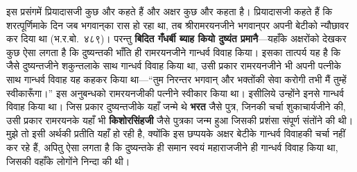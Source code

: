 \begin{sloppypar}\justifying{}
इस प्रसंगमें प्रियादासजी कुछ और कहते हैं और अक्षर कुछ और कहता है। प्रियादासजी कहते हैं कि शरत्पूर्णिमाके दिन जब भगवान्‌का रास हो रहा था, तब श्रीरामरयनजीने भगवान्‌पर अपनी बेटीको न्यौछावर कर दिया था (भ.र.बो.~४८९)। परन्तु \textbf{बिदित गँधर्बी ब्याह कियो दुष्यंत प्रमानै}—यहाँके अक्षरोंको देखकर कुछ ऐसा लगता है कि दुष्यन्तकी भाँति ही रामरयनजीने गान्धर्व विवाह किया। इसका तात्पर्य यह है कि जैसे दुष्यन्तजीने शकुन्तलाके साथ गान्धर्व विवाह किया था, उसी प्रकार रामरयनजीने भी अपनी पत्नीके साथ गान्धर्व विवाह यह कहकर किया था—“तुम निरन्तर भगवान् और भक्तोंकी सेवा करोगी तभी मैं तुम्हें स्वीकारूँगा।” इस अनुबन्धको रामरयनजीकी पत्नीने स्वीकार किया था। इसीलिये उन्होंने इनसे गान्धर्व विवाह किया था। जिस प्रकार दुष्यन्तजीके यहाँ जन्मे थे \textbf{भरत} जैसे पुत्र, जिनकी चर्चा शुकाचार्यजीने की, उसी प्रकार रामरयनके यहाँ भी \textbf{किशोरसिंहजी} जैसे पुत्रका जन्म हुआ जिसकी प्रशंसा संपूर्ण संतोंने की थी। मुझे तो इसी अर्थकी प्रतीति यहाँ हो रही है, क्योंकि इस छप्पयके अक्षर बेटीके गान्धर्व विवाहकी चर्चा नहीं कर रहे हैं, अपितु ऐसा लगता है कि दुष्यन्तके ही समान स्वयं महाराजजीने ही गान्धर्व विवाह किया था, जिसकी वहाँके लोगोंने निन्दा की थी।
\end{sloppypar}


